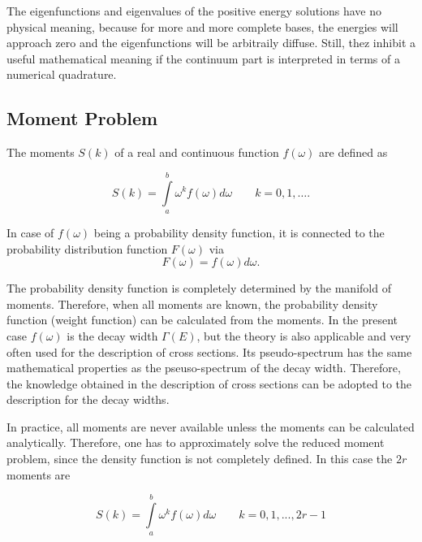 The eigenfunctions and eigenvalues of the positive energy solutions have no physical
meaning, because for more and more complete bases, the energies will approach zero
and the eigenfunctions will be arbitraily diffuse. Still, thez inhibit a useful
mathematical meaning if the continuum part is interpreted in terms of
a numerical quadrature.

%
%




\subsection{Moment Problem}

The moments $S(k)$ of a real and continuous function $f(\omega)$ are defined
as

\begin{equation}
  S(k) = \int\limits_a^b \omega^k f(\omega) d\omega \quad\quad k=0,1,\dots  .
\end{equation}

In case of $f(\omega)$ being a probability density function, it is connected
to the probability distribution function $F(\omega)$ via
\begin{equation}
  F(\omega) = f(\omega){d\omega} .
\end{equation}

The probability density function is completely determined by the manifold
of moments. Therefore, when all moments are known, the probability density
function  (weight function) can be calculated from the moments.
In the present case $f(\omega)$
is the decay width $\Gamma(E)$, but the theory is also applicable and very often
used for the description of cross sections. Its pseudo-spectrum has the same
mathematical properties as the pseuso-spectrum of the decay width. Therefore,
the knowledge obtained in the description of cross sections can be adopted to
the description for the decay widths.

In practice, all moments are never available unless the moments can be
calculated analytically. Therefore, one has to approximately solve the reduced
moment problem, since the density function is not completely defined.
In this case the $2r$ moments are

\begin{equation}
  S(k) = \int\limits_a^b \omega^k f(\omega) d\omega \quad\quad k=0,1,...,2r-1
\end{equation}





